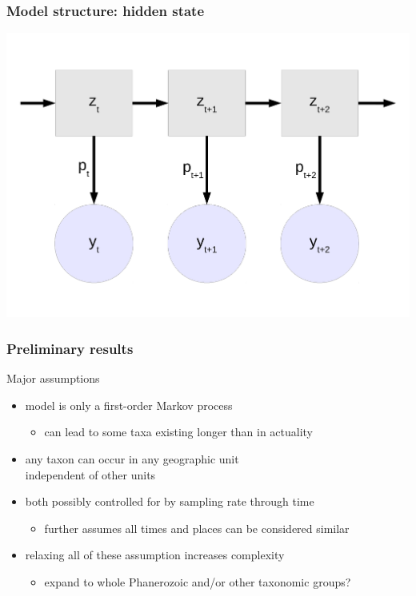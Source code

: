 \documentclass{beamer}
\begin{document}
\begin{frame}
  \frametitle{Model structure: hidden state}
  \begin{center}
    \includegraphics[width=\textwidth,height=0.8\textheight,keepaspectratio=true]{figure/hidden_state}
  \end{center}
\end{frame}


\begin{frame}
  \frametitle{Preliminary results}
\end{frame}

\begin{frame}
  \begin{block}{Major assumptions}
    \begin{itemize}
      \item model is only a first-order Markov process
        \begin{itemize}
          \item can lead to some taxa existing longer than in actuality
        \end{itemize}
      \item any taxon can occur in any geographic unit \\independent of other units
      \item both possibly controlled for by sampling rate through time
        \begin{itemize}
          \item further assumes all times and places can be considered similar
        \end{itemize}
      \item relaxing all of these assumption increases complexity
        \begin{itemize}
          \item expand to whole Phanerozoic and/or other taxonomic groups?
        \end{itemize}
    \end{itemize}
  \end{block}
\end{frame}
\end{document}
